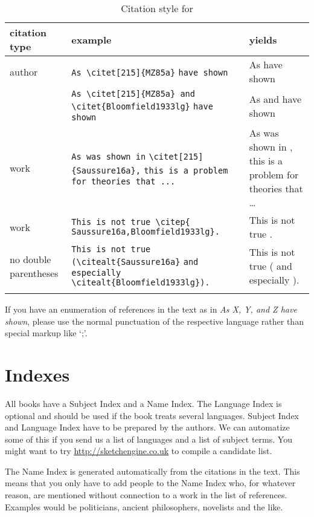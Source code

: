 \begin{table}[bt] 
\caption{Citation style for \lsp}%
\label{tab-citation}
\begin{tabular}{p{1.2cm}>{\small}p{6.2cm}p{3.8cm}}
\lsptoprule
citation type & example &yields\\
\midrule
author & \raggedright \verb+As \citet[215]{MZ85a}+
	  \verb+have shown+             &As \citet[215]{MZ85a} have shown\\ 
       & \raggedright  \verb+As \citet[215]{MZ85a} and+
	  \verb+\citet{Bloomfield1933lg}+
	  \verb+have shown+ 
					  &  As \citet[215]{MZ85a} and \citet{Bloomfield1933lg} have shown\\ 
work   & \raggedright  \verb+As was shown in+ 
	  \verb+\citet[215]{Saussure16a},+
	  \verb+this is a problem for theories that ...+ & As was shown in \citet[215]{Saussure16a}, this is a problem for theories that \ldots\\ 
work   & \raggedright  \verb+This is not true \citep{+  
	  \verb+Saussure16a,Bloomfield1933lg}.+ & This is not true \citep{Saussure16a,Bloomfield1933lg}.\\[2em]
no double parentheses   & \raggedright \verb+This is not true+
			    \verb+(\citealt{Saussure16a}+
			    \verb+and especially+
			    \verb+\citealt{Bloomfield1933lg}).+& This is not true (\citealt{Saussure16a} and especially \citealt{Bloomfield1933lg}).\\
\lspbottomrule
\end{tabular}

\end{table}
\nocite{Bresnan82b}%
 
\newpage  
If you have an enumeration of references in the text as in \emph{As X, Y, and Z have shown}, please use
the normal punctuation of the respective language rather than special markup like `;'.


\section{Indexes}
All {\lsp} books have a Subject Index and a Name Index. The Language Index is optional and should be used if the book treats several languages. Subject Index and Language Index have to be prepared by the authors. We can automatize some of this if you send us a list of languages and a list of subject terms. You might want to try \url{http://sketchengine.co.uk} to compile a candidate list. 

The Name Index is generated automatically from the citations in the text. This means that you only have to add people to the Name Index who, for whatever reason, are mentioned without connection to a work in the list of references. Examples would be politicians, ancient philosophers, novelists and the like.
 
